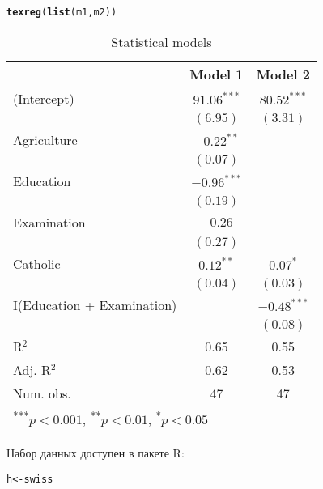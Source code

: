 \documentclass[pdftex,11pt,openany]{book}\usepackage[]{graphicx}\usepackage[]{color}
\makeatletter
\newcommand{\hlstd}[1]{\textcolor[rgb]{0.345,0.345,0.345}{#1}}%
\newcommand{\hlkwb}[1]{\textcolor[rgb]{0.69,0.353,0.396}{#1}}%
\newcommand{\hlkwd}[1]{\textcolor[rgb]{0.737,0.353,0.396}{\textbf{#1}}}%
\newenvironment{kframe}{%
 \def\at@end@of@kframe{}%
 \ifinner\ifhmode%
  \def\at@end@of@kframe{\end{minipage}}%
  \begin{minipage}{\columnwidth}%
 \fi\fi%
 \def\FrameCommand##1{\hskip\@totalleftmargin \hskip-\fboxsep
 \colorbox{shadecolor}{##1}\hskip-\fboxsep
     \hskip-\linewidth \hskip-\@totalleftmargin \hskip\columnwidth}%
 \MakeFramed {\advance\hsize-\width
   \@totalleftmargin\z@ \linewidth\hsize
   \@setminipage}}%
 {\par\unskip\endMakeFramed%
 \at@end@of@kframe}
\newenvironment{knitrout}{}{} %
\makeatother
\begin{document}
\begin{problem}
\begin{kframe}
\begin{alltt}
\hlkwd{texreg}\hlstd{(}\hlkwd{list}\hlstd{(m1,m2))}
\end{alltt}
\end{kframe}
\begin{table}
\begin{center}
\begin{tabular}{l c c }
\hline
                           & Model 1 & Model 2 \\
\hline
(Intercept)                & $91.06^{***}$ & $80.52^{***}$ \\
                           & $(6.95)$      & $(3.31)$      \\
Agriculture                & $-0.22^{**}$  &               \\
                           & $(0.07)$      &               \\
Education                  & $-0.96^{***}$ &               \\
                           & $(0.19)$      &               \\
Examination                & $-0.26$       &               \\
                           & $(0.27)$      &               \\
Catholic                   & $0.12^{**}$   & $0.07^{*}$    \\
                           & $(0.04)$      & $(0.03)$      \\
I(Education + Examination) &               & $-0.48^{***}$ \\
                           &               & $(0.08)$      \\
\hline
R$^2$                      & 0.65          & 0.55          \\
Adj. R$^2$                 & 0.62          & 0.53          \\
Num. obs.                  & 47            & 47            \\
\hline
\multicolumn{3}{l}{\scriptsize{\textsuperscript{***}$p<0.001$, 
  \textsuperscript{**}$p<0.01$, 
  \textsuperscript{*}$p<0.05$}}
\end{tabular}
\caption{Statistical models}
\label{table:coefficients}
\end{center}
\end{table}




Набор данных доступен в пакете R:
\begin{knitrout}
\color{fgcolor}\begin{kframe}
\begin{alltt}
\hlstd{h} \hlkwb{<-} \hlstd{swiss}
\end{alltt}
\end{kframe}
\end{knitrout}



\end{problem}
\end{document}
